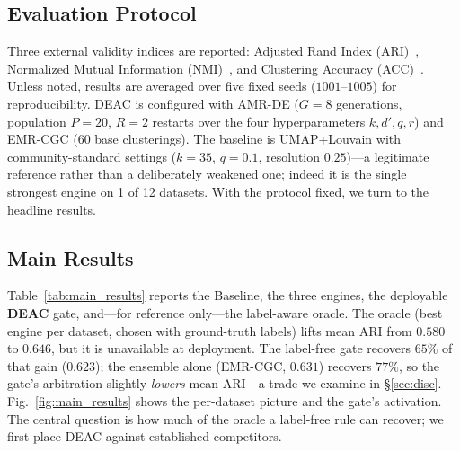 \documentclass[journal]{IEEEtran}
\begin{document}
\subsection{Evaluation Protocol}

Three external validity indices are reported: Adjusted Rand Index (ARI)~\cite{hubert1985comparing}, Normalized Mutual Information (NMI)~\cite{strehl2002cluster}, and Clustering Accuracy (ACC)~\cite{yang2010image}. Unless noted, results are averaged over five fixed seeds ($1001$--$1005$) for reproducibility. DEAC is configured with AMR-DE ($G{=}8$ generations, population $P{=}20$, $R{=}2$ restarts over the four hyperparameters $k,d',q,r$) and EMR-CGC (60 base clusterings). The baseline is UMAP+Louvain with community-standard settings ($k{=}35$, $q{=}0.1$, resolution $0.25$)---a legitimate reference rather than a deliberately weakened one; indeed it is the single strongest engine on 1 of 12 datasets. With the protocol fixed, we turn to the headline results.

\subsection{Main Results}

Table~\ref{tab:main_results} reports the Baseline, the three engines, the deployable \textbf{DEAC} gate, and---for reference only---the label-aware oracle. The oracle (best engine per dataset, chosen with ground-truth labels) lifts mean ARI from $0.580$ to $0.646$, but it is unavailable at deployment. The label-free gate recovers $65\%$ of that gain ($0.623$); the ensemble alone (EMR-CGC, $0.631$) recovers $77\%$, so the gate's arbitration slightly \emph{lowers} mean ARI---a trade we examine in \S\ref{sec:disc}. Fig.~\ref{fig:main_results} shows the per-dataset picture and the gate's activation. The central question is how much of the oracle a label-free rule can recover; we first place DEAC against established competitors.


\end{document}
